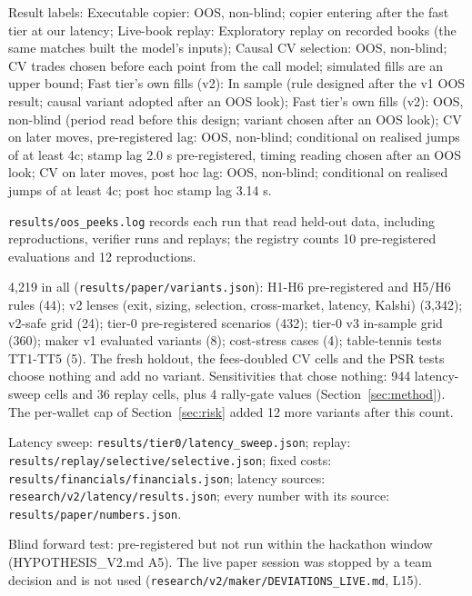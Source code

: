 \documentclass[11pt,letterpaper]{article}
\begin{document}
Result labels: Executable copier: OOS, non-blind; copier entering after the fast tier at our latency; Live-book replay: Exploratory replay on recorded books (the same matches built the model's inputs); Causal CV selection: OOS, non-blind; CV trades chosen before each point from the call model; simulated fills are an upper bound; Fast tier's own fills (v2): In sample (rule designed after the v1 OOS result; causal variant adopted after an OOS look); Fast tier's own fills (v2): OOS, non-blind (period read before this design; variant chosen after an OOS look); CV on later moves, pre-registered lag: OOS, non-blind; conditional on realised jumps of at least 4c; stamp lag 2.0 s pre-registered, timing reading chosen after an OOS look; CV on later moves, post hoc lag: OOS, non-blind; conditional on realised jumps of at least 4c; post hoc stamp lag 3.14 s.

 \nolinkurl{results/oos_peeks.log} records each run that read held-out data, including
reproductions, verifier runs and replays; the registry counts
10 pre-registered evaluations and 12 reproductions.

 4,219 in all (\nolinkurl{results/paper/variants.json}):
H1-H6 pre-registered and H5/H6 rules (44); v2 lenses (exit, sizing, selection, cross-market, latency, Kalshi) (3,342); v2-safe grid (24); tier-0 pre-registered scenarios (432); tier-0 v3 in-sample grid (360); maker v1 evaluated variants (8); cost-stress cases (4); table-tennis tests TT1-TT5 (5).
The fresh holdout, the fees-doubled CV cells and the PSR tests choose nothing and add no variant.
Sensitivities that chose nothing: 944 latency-sweep cells and 36 replay cells, plus 4 rally-gate values (Section~\ref{sec:method}). The per-wallet cap of Section~\ref{sec:risk}
added 12 more variants after this count.

 Latency sweep: \nolinkurl{results/tier0/latency_sweep.json}; replay:
\nolinkurl{results/replay/selective/selective.json}; fixed costs: \nolinkurl{results/financials/financials.json}; latency
sources: \nolinkurl{research/v2/latency/results.json}; every number with its source: \nolinkurl{results/paper/numbers.json}.

 Blind forward test: pre-registered but not run within the hackathon window (HYPOTHESIS\_V2.md A5). The
live paper session was stopped by a team decision and is not used (\nolinkurl{research/v2/maker/DEVIATIONS_LIVE.md},
L15).
\end{document}
